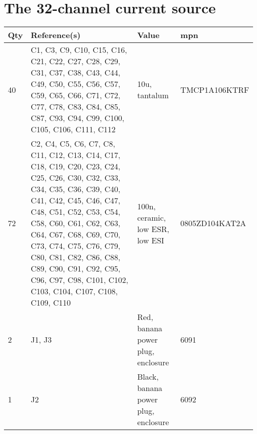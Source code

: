 \section{The 32-channel current source}
\begin{longtable}[c]{@{} lp{5cm}p{5cm}l @{}}
    \toprule
    Qty & Reference(s)                                                                                                                                                                                                                                                                                                                                                             & Value                                               & \acrshort{mpn}  \\
    \midrule
    40  & C1, C3, C9, C10, C15, C16, C21, C22, C27, C28, C29, C31, C37, C38, C43, C44, C49, C50, C55, C56, C57, C59, C65, C66, C71, C72, C77, C78, C83, C84, C85, C87, C93, C94, C99, C100, C105, C106, C111, C112                                                                                                                                                                 & 10u, tantalum                                       & TMCP1A106KTRF   \\
    72  & C2, C4, C5, C6, C7, C8, C11, C12, C13, C14, C17, C18, C19, C20, C23, C24, C25, C26, C30, C32, C33, C34, C35, C36, C39, C40, C41, C42, C45, C46, C47, C48, C51, C52, C53, C54, C58, C60, C61, C62, C63, C64, C67, C68, C69, C70, C73, C74, C75, C76, C79, C80, C81, C82, C86, C88, C89, C90, C91, C92, C95, C96, C97, C98, C101, C102, C103, C104, C107, C108, C109, C110 & 100n, ceramic, low ESR, low ESI                     & 0805ZD104KAT2A  \\
    2   & J1, J3                                                                                                                                                                                                                                                                                                                                                                   & Red, banana power plug, enclosure                   & 6091            \\
    1   & J2                                                                                                                                                                                                                                                                                                                                                                       & Black, banana power plug, enclosure                 & 6092            \\

\end{longtable}

